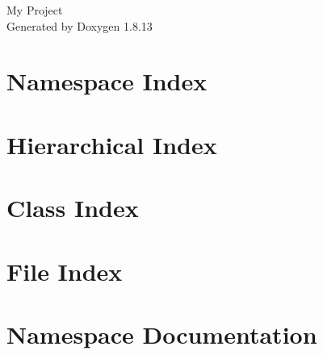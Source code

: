 \documentclass[twoside]{book}
\newcommand{\+}{\discretionary{\mbox{\scriptsize$\hookleftarrow$}}{}{}}
\newcommand{\clearemptydoublepage}{%
  \newpage{\pagestyle{empty}\cleardoublepage}%
}
\begin{document}
\hypersetup{pageanchor=false,
             bookmarksnumbered=true,
             pdfencoding=unicode
            }
\begin{titlepage}
\vspace*{7cm}
\begin{center}%
{\Large My Project }\\
\vspace*{1cm}
{\large Generated by Doxygen 1.8.13}\\
\end{center}
\end{titlepage}
\clearemptydoublepage
{}
\tableofcontents
\clearemptydoublepage
{}
\hypersetup{pageanchor=true}

\chapter{Namespace Index}

\chapter{Hierarchical Index}

\chapter{Class Index}

\chapter{File Index}

\chapter{Namespace Documentation}






\end{document}
